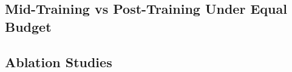 \documentclass{article}
\begin{document}
\subsection{Mid-Training vs Post-Training Under Equal Budget}
\label{sec:exp:budget}



%
%
%
%
%
%
%
\subsection{Ablation Studies}
\label{sec:exp:ablation}

\end{document}
